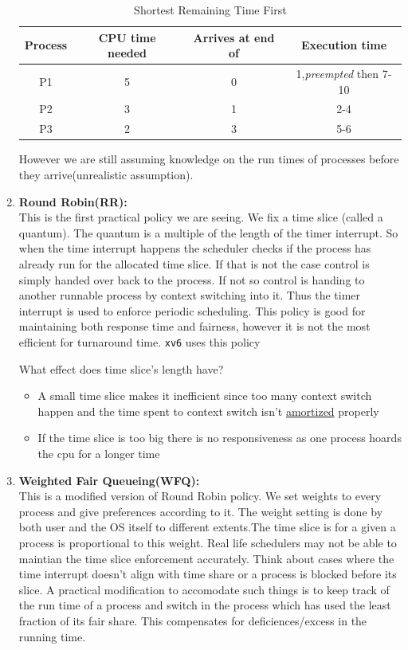 \documentclass[12pt]{article}
\begin{document}
\begin{enumerate}
    \begin{table}[h]
        \centering
        \begin{tabular}{|c|c|c|c|}
        \hline
        \textbf{Process} & \textbf{CPU time needed} & \textbf{Arrives at end of} & \textbf{Execution time} \\
        \hline
        P1 & 5 & 0 & 1,\textit{preempted} then 7-10 \\
        \hline
        P2 & 3 & 1 & 2-4 \\
        \hline
        P3 & 2 & 3 & 5-6 \\
        \hline
        \end{tabular}
        \caption{Shortest Remaining Time First}
        \label{tab:SRTF}
    \end{table}
    However we are still assuming knowledge on the run times of processes before they arrive(unrealistic assumption).
\item \textbf{Round Robin(RR):}\\ This is the first practical policy we are seeing. We fix a time slice (called a quantum). The quantum is a multiple of the length of the timer interrupt.
So when the time interrupt happens the scheduler checks if the process has already run for the allocated time slice. If that is not the case control is simply handed over back to the process. If not so control is handing to another
runnable process by context switching into it. Thus the timer interrupt is used to enforce periodic scheduling. 
This policy is good for maintaining both response time and fairness, however it is not the most efficient for turnaround time. \texttt{xv6} uses this policy

What effect does time slice's length have?
\begin{itemize}[topsep=0pt, partopsep=0pt, itemsep=0pt, parsep=0pt]
    \item A small time slice makes it inefficient since too many context switch happen and the time spent to context switch isn't \href{https://english.stackexchange.com/a/138566}{amortized} properly
    \item If the time slice is too big there is no responsiveness as one process hoards the cpu for a longer time
\end{itemize}

\item \textbf{Weighted Fair Queueing(WFQ):} \\This is a modified version of Round Robin policy. We set weights to every process and give preferences according to it.
The weight setting is done by both user and the OS itself to different extents.The time slice is for a given a process is proportional to this weight. Real life schedulers may not be able to maintian the time slice enforcement accurately. Think about cases where the time interrupt
doesn't align with time share or a process is blocked before its slice. A practical modification to accomodate such things is to keep track of the run time of a process and switch in the process which has used the least fraction of its fair share. This compensates for deficiences/excess in the running time.
 

\end{enumerate}
\end{document}
